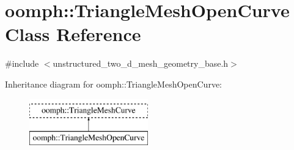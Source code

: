 \hypertarget{classoomph_1_1TriangleMeshOpenCurve}{}\section{oomph\+:\+:Triangle\+Mesh\+Open\+Curve Class Reference}
\label{classoomph_1_1TriangleMeshOpenCurve}


{\ttfamily \#include $<$unstructured\+\_\+two\+\_\+d\+\_\+mesh\+\_\+geometry\+\_\+base.\+h$>$}

Inheritance diagram for oomph\+:\+:Triangle\+Mesh\+Open\+Curve\+:\begin{figure}[H]
\begin{center}
\leavevmode
\includegraphics[height=2.000000cm]{classoomph_1_1TriangleMeshOpenCurve}
\end{center}
\end{figure}
